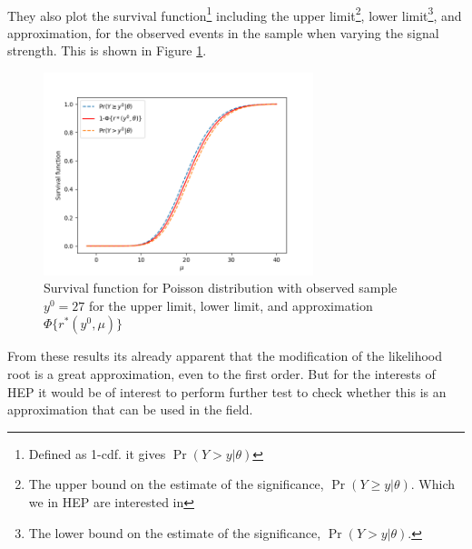 \documentclass[14pt, a4paper]{article}  %
\begin{document}
\\They also plot the survival function\footnote{Defined as 1-cdf. it gives $\Pr(Y>y|\theta)$} including the upper limit\footnote{The upper bound on the estimate of the significance, $\Pr(Y\geq y|\theta)$. Which we in HEP are interested in}, lower limit\footnote{The lower bound on the estimate of the significance, $\Pr(Y> y|\theta)$.}, and approximation, for the observed events in the sample when varying the signal strength. This is shown in Figure \ref{fig:book_sf}.
\begin{figure}[!ht]
	\centering
        \includegraphics[width=0.7\textwidth]{Book_examples/book_sig.png}
	\caption{Survival function for Poisson distribution with observed sample $y^0=27$ for the upper limit, lower limit, and approximation $\Phi\{r^*(y^0,\mu)\}$}\label{fig:book_sf}
\end{figure} 
\newpage\noindent From these results its already apparent that the modification of the likelihood root is a great approximation, even to the first order. But for the interests of HEP it would be of interest to perform further test to check whether this is an approximation that can be used in the field.
\end{document}
